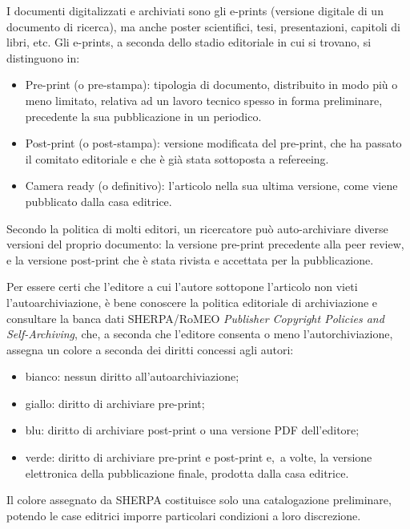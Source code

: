 \documentclass[
  b5paper,
  twoside,
  12pt,
  chapterprefix=false,
  bibliography=totocnumbered,
  parskip=false]{scrbook}
\begin{document}
I documenti digitalizzati e archiviati sono gli e-prints (versione
digitale di un documento di ricerca), ma anche poster scientifici, tesi,
presentazioni, capitoli di libri, etc. Gli e-prints, a seconda dello
stadio editoriale in cui si trovano, si distinguono in:

\begin{itemize}
\item
  Pre-print (o pre-stampa): tipologia di documento, distribuito in
  modo più o meno limitato, relativa ad un lavoro tecnico spesso in
  forma preliminare, precedente la sua pubblicazione in un periodico.
\item
  Post-print (o post-stampa): versione modificata del pre-print, che
  ha passato il comitato editoriale e che è già stata sottoposta a
  refereeing.
\item
  Camera ready (o definitivo): l'articolo nella sua ultima versione,
  come viene pubblicato dalla casa editrice.
\end{itemize}

Secondo la politica di molti editori, un ricercatore può auto-archiviare
diverse versioni del proprio documento: la versione pre-print precedente
alla peer review, e la versione post-print che è stata rivista e
accettata per la pubblicazione.

Per essere certi che l'editore a cui l'autore sottopone l'articolo non
vieti l'autoarchiviazione, è bene conoscere la politica editoriale di
archiviazione e consultare la banca dati SHERPA/RoMEO \emph{Publisher
Copyright Policies and Self-Archiving}, che, a seconda che l'editore
consenta o meno l'autorchiviazione, assegna un colore a seconda dei
diritti concessi agli autori:

\begin{itemize}
\item
  bianco: nessun diritto all'autoarchiviazione;
\item
  giallo: diritto di archiviare pre-print;
\item
  blu: diritto di archiviare post-print o una versione PDF
  dell'editore;
\item
  verde: diritto di archiviare pre-print e post-print e,~a volte, la
  versione elettronica della pubblicazione finale, prodotta dalla casa
  editrice.
\end{itemize}

Il colore assegnato da SHERPA costituisce solo una catalogazione
preliminare, potendo le case editrici imporre particolari condizioni a
loro discrezione.
\end{document}

